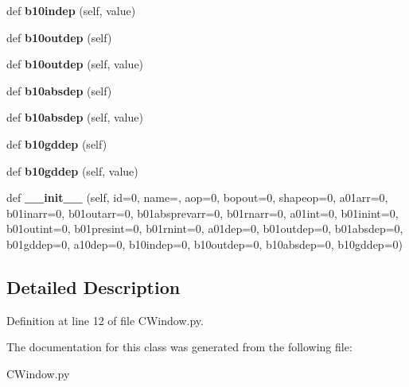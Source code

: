 \begin{DoxyCompactItemize}
\mbox{\label{class_c_window_1_1_c_window_a665929a6e67ed2e468c7a95c5a24fae0}} 
def {\bfseries b10indep} (self, value)
\item 
\mbox{\label{class_c_window_1_1_c_window_a48f53620c612eacce5d8816196d664c4}} 
def {\bfseries b10outdep} (self)
\item 
\mbox{\label{class_c_window_1_1_c_window_ab850977c3c8db26394b4d80358e231bb}} 
def {\bfseries b10outdep} (self, value)
\item 
\mbox{\label{class_c_window_1_1_c_window_ad4b4c069c3a18b0590d729c2607c237c}} 
def {\bfseries b10absdep} (self)
\item 
\mbox{\label{class_c_window_1_1_c_window_ac8e18463400c8c7f8dd563fa4ad469a4}} 
def {\bfseries b10absdep} (self, value)
\item 
\mbox{\label{class_c_window_1_1_c_window_aa0566469b041a02ff23429d429216264}} 
def {\bfseries b10gddep} (self)
\item 
\mbox{\label{class_c_window_1_1_c_window_a216b8adb77559e84d224ec7b4deb51a3}} 
def {\bfseries b10gddep} (self, value)
\item 
\mbox{\label{class_c_window_1_1_c_window_acce7a06489663d7d0aa8e7cc572206b9}} 
def {\bfseries \+\_\+\+\_\+init\+\_\+\+\_\+} (self, id=0, name=\textquotesingle{}\textquotesingle{}, aop=0, bopout=0, shapeop=0, a01arr=0, b01inarr=0, b01outarr=0, b01absprevarr=0, b01rnarr=0, a01int=0, b01inint=0, b01outint=0, b01presint=0, b01rnint=0, a01dep=0, b01outdep=0, b01absdep=0, b01gddep=0, a10dep=0, b10indep=0, b10outdep=0, b10absdep=0, b10gddep=0)
\end{DoxyCompactItemize}


\subsection{Detailed Description}


Definition at line 12 of file C\+Window.\+py.



The documentation for this class was generated from the following file\+:\begin{DoxyCompactItemize}
\item 
C\+Window.\+py\end{DoxyCompactItemize}
